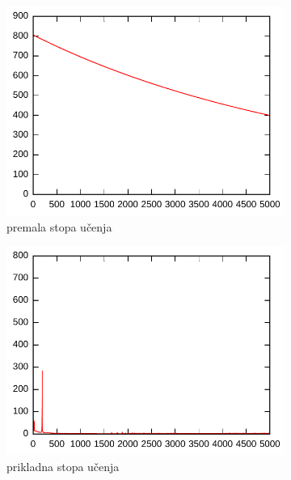 \documentclass{article}
\begin{document}
\begin{figure}[h]
    \centering
    \begin{subfigure}[b]{0.32\textwidth}
        \centering
        \includegraphics[width=\textwidth]{img/eta-stochastic-low.pdf}
        \caption{premala stopa učenja}
    \end{subfigure}
    \hfill
    \begin{subfigure}[b]{0.32\textwidth}
        \centering
        \includegraphics[width=\textwidth]{img/eta-stochastic-middle.pdf}
        \caption{prikladna stopa učenja}
    \end{subfigure}
    \hfill
    \begin{subfigure}[b]{0.32\textwidth}
        \centering

\end{subfigure}
\end{figure}
\end{document}
